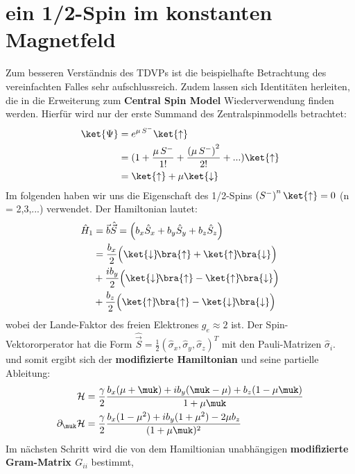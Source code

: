 \section{ein 1/2-Spin im konstanten Magnetfeld}
Zum besseren Verständnis des TDVPs ist die beispielhafte Betrachtung des vereinfachten Falles sehr aufschlussreich. 
Zudem lassen sich Identitäten herleiten, die in die Erweiterung zum \textbf{Central Spin Model} Wiederverwendung finden werden. Hierfür wird nur der erste 
Summand des Zentralspinmodells betrachtet:
\begin{align*}
    \ket{\Psi} &= e^{\mu\thinspace S^-}\ket{\uparrow} \\
            &= (1 + \frac{\mu\thinspace S^{-}}{1!} + \frac{\left(\mu\thinspace S^{-}\right)^2}{2!} + ...)\ket{\uparrow}    \\
            &= \ket{\uparrow} + \mu\ket{\downarrow}
\end{align*}
\noindent Im folgenden haben wir uns die Eigenschaft des 1/2-Spins $\left(S^{-}\right)^{n}\ket{\uparrow}=0$  (n = 2,3,...) verwendet.
Der Hamiltonian lautet:
\begin{align}
    \hat{H}_1 &= \vec{b}\hat{\vec{S}} = \left(b_x\hat{S}_x+b_y\hat{S}_y+b_z\hat{S}_z \right) \\
    &= \frac{b_x}{2}\Bigl(\ket{\downarrow}\!\bra{\uparrow}+\ket{\uparrow}\!\bra{\downarrow}\Bigr) \\
    & + \frac{ib_y}{2}\Bigl(\ket{\downarrow}\!\bra{\uparrow}-\ket{\uparrow}\!\bra{\downarrow}\Bigr) \\
    & + \frac{b_z}{2}\Bigl(\ket{\uparrow}\!\bra{\uparrow}-\ket{\downarrow}\!\bra{\downarrow}\Bigr) 
\end{align}
\noindent wobei der Lande-Faktor des freien Elektrones $g_e\approx 2$ ist. 
Der Spin-Vektororperator hat die Form $\hat{\vec{S}}= \frac{1}{2}\left(\hat{\sigma}_x,\hat{\sigma}_y,\hat{\sigma}_z\right)^T$ mit den Pauli-Matrizen 
$\hat{\sigma}_i$.\\ 
und somit ergibt sich der \textbf{modifizierte Hamiltonian} und seine partielle Ableitung:
\begin{align}
    \mathcal{H} &= \frac{\gamma}{2}\frac{b_x(\mu +\muk) + ib_y(\muk - \mu) + b_z(1-\mu\muk) }{1+\mu\muk}    \\
    \partial_{\muk} \mathcal{H} &= \frac{\gamma}{2} \frac{b_x(1-\mu^2) + ib_y(1+\mu^2) - 2\mu b_z}{(1+\mu\muk)^2} 
\end{align}
\noindent Im nächsten Schritt wird die von dem Hamiltionian unabhängigen \textbf{modifizierte Gram-Matrix $G_{ii}$} bestimmt, 
